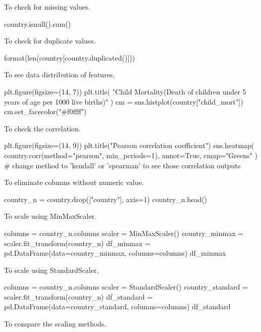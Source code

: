 \documentclass{swfuthesise}
\begin{document}
To check for missing values.

\begin{pythoncode}
country.isnull().sum()
\end{pythoncode}

To check for duplicate values.

\begin{pythoncode}
format(len(country[country.duplicated()]))
\end{pythoncode}

To see data distribution of features. 

\begin{pythoncode}
plt.figure(figsize=(14, 7))
plt.title(
    "Child Mortality\n(Death of children under 5 years of age per 1000 live births)"
)
cm = sns.histplot(country["child_mort"])
cm.set_facecolor("#f0ffff")
\end{pythoncode}

To check the correlation. 

\begin{pythoncode}
plt.figure(figsize=(14, 9))
plt.title("Pearson correlation coefficient")
sns.heatmap(
    country.corr(method="pearson", min_periods=1), annot=True, cmap="Greens"
)  # change method to 'kendall' or 'spearman' to see those correlation outputs
\end{pythoncode}

To eliminate columns without numeric value.

\begin{pythoncode}
country_n = country.drop(["country"], axis=1)
country_n.head()
\end{pythoncode}

To scale using MinMaxScaler.

\begin{pythoncode}
columns = country_n.columns
scaler = MinMaxScaler()
country_minmax = scaler.fit_transform(country_n)
df_minmax = pd.DataFrame(data=country_minmax, columns=columns)
df_minmax
\end{pythoncode}

To scale using StandardScaler.

\begin{pythoncode}
columns = country_n.columns
scaler = StandardScaler()
country_standard = scaler.fit_transform(country_n)
df_standard = pd.DataFrame(data=country_standard, columns=columns)
df_standard
\end{pythoncode}

To compare the scaling methods. 
\end{document}
